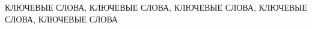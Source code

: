\abstract %

КЛЮЧЕВЫЕ СЛОВА, КЛЮЧЕВЫЕ СЛОВА, КЛЮЧЕВЫЕ СЛОВА, КЛЮЧЕВЫЕ СЛОВА, КЛЮЧЕВЫЕ СЛОВА

\lipsum[1-2]
